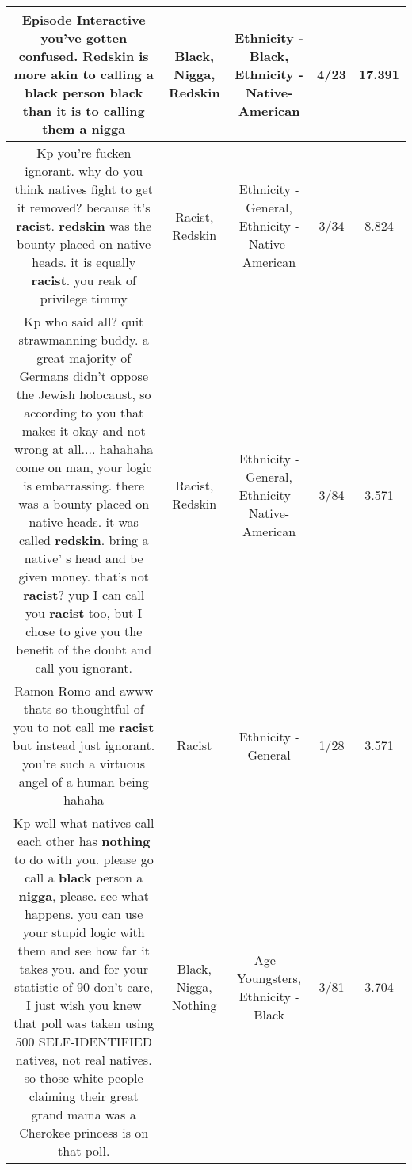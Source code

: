 \documentclass[11pt]{article}
\newlength\mylength
\begin{document}
\begin{center}
\begin{longtable}{|C{.65\mylength}|C{.30\mylength}|C{.12\mylength}|C{.12\mylength}|C{.12\mylength}|}
  \small Episode Interactive you've gotten confused. \textbf{Redskin} is more akin to calling a \textbf{black} person \textbf{black} than it is to calling them a nigga\normalsize   & Black, Nigga, Redskin & Ethnicity - Black, Ethnicity - Native-American & 4/23 & 17.391 \\  \hline
  \small Kp you're fucken ignorant. why do you think natives fight to get it removed? because it's \textbf{racist}. \textbf{redskin} was the bounty placed on native heads. it is equally \textbf{racist}. you reak of privilege timmy\normalsize   & Racist, Redskin & Ethnicity - General, Ethnicity - Native-American & 3/34 & 8.824 \\  \hline
  \small Kp who said all? quit strawmanning buddy. a great majority of Germans didn't oppose the Jewish holocaust, so according to you that makes it okay and not wrong at all.... hahahaha come on man, your logic is embarrassing. there was a bounty placed on native heads. it was called \textbf{redskin}. bring a native' s head and be given money. that's not \textbf{racist}? yup I can call you \textbf{racist} too, but I chose to give you the benefit of the doubt and call you ignorant.\normalsize   & Racist, Redskin & Ethnicity - General, Ethnicity - Native-American & 3/84 & 3.571 \\  \hline
  \small Ramon Romo and awww thats so thoughtful of you to not call me \textbf{racist} but instead just ignorant. you're such a virtuous angel of a human being hahaha\normalsize   & Racist & Ethnicity - General & 1/28 & 3.571 \\  \hline
  \small Kp well what natives call each other has \textbf{nothing} to do with you. please go call a \textbf{black} person a \textbf{nigga}, please. see what happens. you can use your stupid logic with them and see how far it takes you. and for your statistic of 90 don't care, I just wish you knew that poll was taken using 500 SELF-IDENTIFIED natives, not real natives. so those white people claiming their great grand mama was a Cherokee princess is on that poll.\normalsize   & Black, Nigga, Nothing & Age - Youngsters, Ethnicity - Black & 3/81 & 3.704 \\  \hline

\end{longtable}
\end{center}
\end{document}
